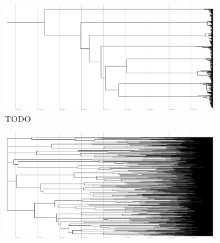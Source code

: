 \begin{figure}
  \begin{subfigure}[b]{1\columnwidth}
    \includegraphics[height=0.12\textheight,width=\textwidth]{img/perfect-tree-phylogenies-log/epoch=7+resolution=3+treatment=20/a=collapsed-phylogeny+epoch=00007+mut_distn=np.random.standard_normal+num_generations=32768+num_islands=1+num_niches=8+p_island_migration=0.01+p_niche_invasion=3.0517578125e-08+population_size=32768+r.../eplicate=0+tournament_size=2+treatment=20+_generation=262144+_index=20+ext=.pdf}
    \caption{%
      TODO}
    \label{fig:perfect-tree-phylogenies-log:}
  \end{subfigure}
  \hfill
  \begin{subfigure}[b]{1\columnwidth}
    \includegraphics[height=0.12\textheight,width=\textwidth]{img/perfect-tree-phylogenies-log/epoch=7+resolution=3+treatment=22/a=collapsed-phylogeny+epoch=00007+mut_distn=np.random.standard_normal+num_generations=32768+num_islands=1024+num_niches=4+p_island_migration=0.01+p_niche_invasion=3.0517578125e-08+population_size=3276.../8+replicate=0+tournament_size=2+treatment=22+_generation=262144+_index=22+ext=.pdf}

\end{subfigure}
\end{figure}
